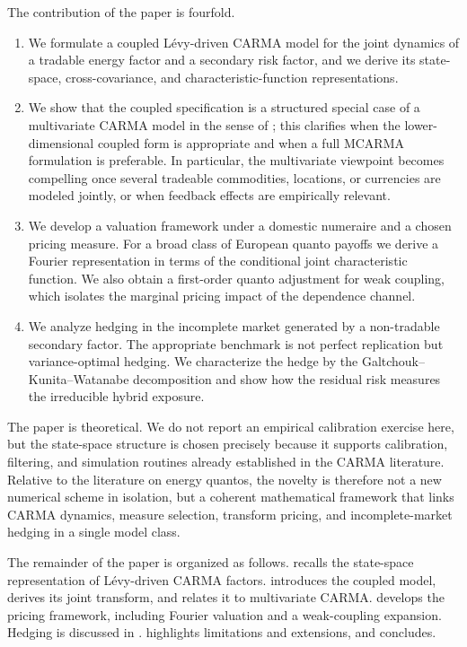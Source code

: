 \documentclass[10pt,a4paper,reqno]{amsart}
\newcommand{\1}{\mathbbm{1}}
\begin{document}
The contribution of the paper is fourfold.
\begin{enumerate}[label=(\roman*)]
  \item We formulate a coupled Lévy-driven CARMA model for the joint dynamics of
    a tradable energy factor and a secondary risk factor, and we derive its
    state-space, cross-covariance, and characteristic-function representations.
  \item We show that the coupled specification is a structured special case of a
    multivariate CARMA model in the sense of \citet{Mar07}; this clarifies when
    the lower-dimensional coupled form is appropriate and when a full MCARMA
    formulation is preferable. In particular, the multivariate viewpoint becomes
    compelling once several tradeable commodities, locations, or currencies are
    modeled jointly, or when feedback effects are empirically relevant.
  \item We develop a valuation framework under a domestic numeraire and a chosen
    pricing measure. For a broad class of European quanto payoffs we derive a
    Fourier representation in terms of the conditional joint characteristic
    function. We also obtain a first-order quanto adjustment for weak coupling,
    which isolates the marginal pricing impact of the dependence channel.
  \item We analyze hedging in the incomplete market generated by a non-tradable
    secondary factor. The appropriate benchmark is not perfect replication but
    variance-optimal hedging. We characterize the hedge by the
    Galtchouk--Kunita--Watanabe decomposition and show how the residual risk
    measures the irreducible hybrid exposure.
\end{enumerate}

The paper is theoretical. We do not report an empirical calibration exercise
here, but the state-space structure is chosen precisely because it supports
calibration, filtering, and simulation routines already established in the
CARMA literature. Relative to the literature on energy quantos, the novelty is
therefore not a new numerical scheme in isolation, but a coherent mathematical
framework that links CARMA dynamics, measure selection, transform pricing, and
incomplete-market hedging in a single model class.

The remainder of the paper is organized as follows.
 recalls the state-space representation of
Lévy-driven CARMA factors.  introduces the
coupled model, derives its joint transform, and relates it to multivariate
CARMA.  develops the pricing framework,
including Fourier valuation and a weak-coupling expansion. Hedging is discussed
in .  highlights limitations
and extensions, and  concludes.
\end{document}
